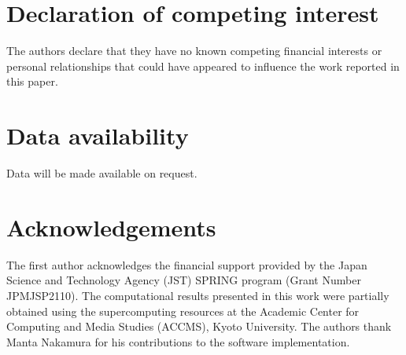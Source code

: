 \documentclass[a4paper,fleqn]{cas-sc}
\begin{document}
\maketitle






\section*{Declaration of competing interest}
The authors declare that they have no known competing financial interests or
personal relationships that could have appeared to influence the work reported
in this paper.

\section*{Data availability}
Data will be made available on request.

\section*{Acknowledgements}
The first author acknowledges the financial support provided by the Japan Science and Technology Agency (JST) SPRING program (Grant Number JPMJSP2110). The computational results presented in this work were partially obtained using the supercomputing resources at the Academic Center for Computing and Media Studies (ACCMS), Kyoto University. The authors thank Manta Nakamura for his contributions to the software implementation.


\printcredits

\appendix






\end{document}
